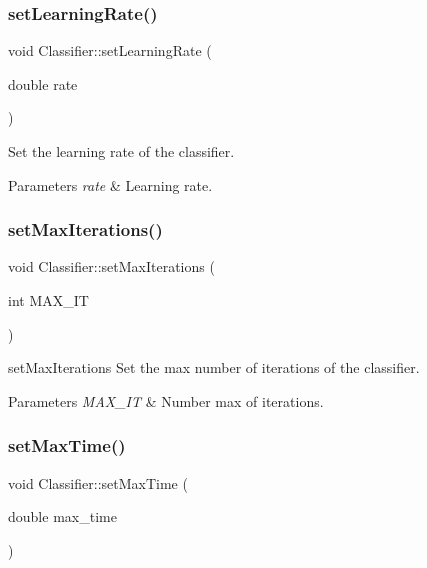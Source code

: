 \subsubsection{\texorpdfstring{set\+Learning\+Rate()}{setLearningRate()}}
{\footnotesize\ttfamily void Classifier\+::set\+Learning\+Rate (\begin{DoxyParamCaption}\item[{double}]{rate }\end{DoxyParamCaption})}



Set the learning rate of the classifier. 


\begin{DoxyParams}{Parameters}
{\em rate} & Learning rate. \\
\hline
\end{DoxyParams}
\mbox{\label{class_classifier_a58540f77a22c0f1774d0089fac713498}} 
\subsubsection{\texorpdfstring{set\+Max\+Iterations()}{setMaxIterations()}}
{\footnotesize\ttfamily void Classifier\+::set\+Max\+Iterations (\begin{DoxyParamCaption}\item[{int}]{M\+A\+X\+\_\+\+IT }\end{DoxyParamCaption})}



set\+Max\+Iterations Set the max number of iterations of the classifier. 


\begin{DoxyParams}{Parameters}
{\em M\+A\+X\+\_\+\+IT} & Number max of iterations. \\
\hline
\end{DoxyParams}
\mbox{\label{class_classifier_a5da324a0de94b7171484f3b1f1f22fbd}} 
\subsubsection{\texorpdfstring{set\+Max\+Time()}{setMaxTime()}}
{\footnotesize\ttfamily void Classifier\+::set\+Max\+Time (\begin{DoxyParamCaption}\item[{double}]{max\+\_\+time }\end{DoxyParamCaption})}



